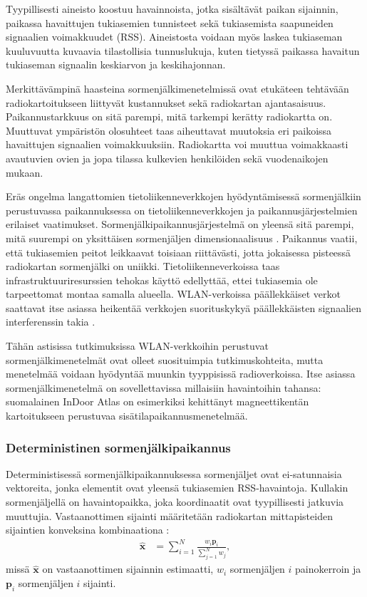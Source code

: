 Tyypillisesti aineisto koostuu havainnoista, jotka sisältävät paikan sijainnin,
paikassa havaittujen tukiasemien tunnisteet sekä tukiasemista saapuneiden
signaalien voimakkuudet (RSS). Aineistosta voidaan myös laskea tukiaseman
kuuluvuutta kuvaavia tilastollisia tunnuslukuja, kuten tietyssä paikassa
havaitun tukiaseman signaalin keskiarvon ja keskihajonnan.

Merkittävämpinä haasteina sormenjälkimenetelmissä ovat etukäteen tehtävään
radiokartoitukseen liittyvät kustannukset sekä radiokartan ajantasaisuus.
Paikannustarkkuus on sitä parempi, mitä tarkempi kerätty radiokartta on.
Muuttuvat ympäristön olosuhteet taas aiheuttavat muutoksia eri paikoissa
havaittujen signaalien voimakkuuksiin. Radiokartta voi muuttua voimakkaasti
avautuvien ovien ja jopa tilassa kulkevien henkilöiden sekä vuodenaikojen
mukaan.

Eräs ongelma langattomien tietoliikenneverkkojen hyödyntämisessä sormenjälkiin
perustuvassa paikannuksessa on tietoliikenneverkkojen ja paikannusjärjestelmien
erilaiset vaatimukset.  Sormenjälkipaikannusjärjestelmä on yleensä sitä
parempi, mitä suurempi on yksittäisen sormenjäljen dimensionaalisuus
\cite{harle2013}. Paikannus vaatii, että tukiasemien peitot leikkaavat toisiaan
riittävästi, jotta jokaisessa pisteessä radiokartan sormenjälki on uniikki.
Tietoliikenneverkoissa taas infrastruktuuriresurssien tehokas käyttö
edellyttää, ettei tukiasemia ole tarpeettomat montaa samalla alueella.
WLAN-verkoissa päällekkäiset verkot saattavat itse asiassa heikentää verkkojen
suorituskykyä päällekkäisten signaalien interferenssin takia \cite{ergin2007}.

Tähän astisissa tutkimuksissa WLAN-verkkoihin perustuvat sormenjälkimenetelmät
ovat olleet suosituimpia tutkimuskohteita, mutta menetelmää voidaan hyödyntää
muunkin tyyppisissä radioverkoissa. Itse asiassa sormenjälkimenetelmä on
sovellettavissa millaisiin havaintoihin tahansa: suomalainen InDoor Atlas on
esimerkiksi kehittänyt magneettikentän kartoitukseen perustuvaa
sisätilapaikannusmenetelmää.

\subsubsection{Deterministinen sormenjälkipaikannus}

Deterministisessä sormenjälkipaikannuksessa sormenjäljet ovat ei-satunnaisia
vektoreita, jonka elementit ovat yleensä tukiasemien RSS-havaintoja. Kullakin
sormenjäljellä on havaintopaikka, joka koordinaatit ovat tyypillisesti jatkuvia
muuttujia. Vastaanottimen sijainti määritetään radiokartan mittapisteiden
sijaintien konveksina kombinaationa \cite{honkavirta2009}:
\begin{align}
  \mathbf{\hat{x}} &= \sum_{i=1}^N \frac{w_i \mathbf{p}_i}{\sum_{j=1}^N w_j},
\end{align}
missä $\mathbf{\hat{x}}$ on vastaanottimen sijainnin estimaatti, $w_i$
sormenjäljen $i$ painokerroin ja $\mathbf{p}_i$ sormenjäljen $i$ sijainti.

